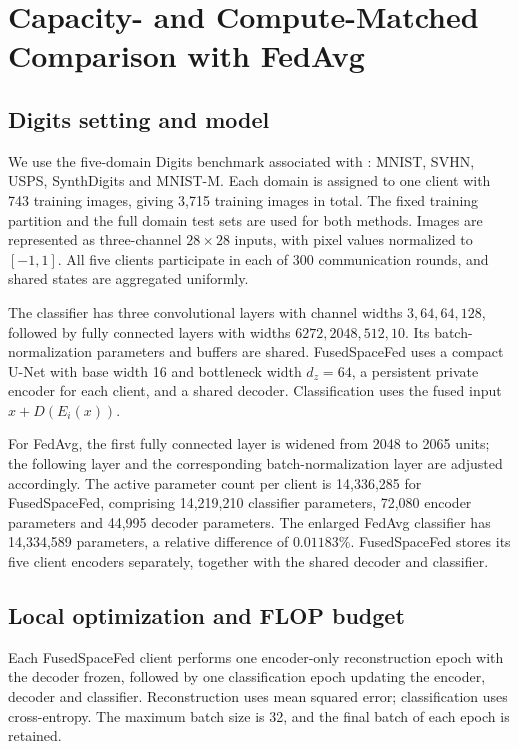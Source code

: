 \section{Capacity- and Compute-Matched Comparison with FedAvg}
\label{app:capacity_compute_comparison}

\subsection{Digits setting and model}

We use the five-domain Digits benchmark associated with
\citet{li2021fedbn}: MNIST, SVHN, USPS, SynthDigits and MNIST-M.
Each domain is assigned to one client with 743 training images, giving
3,715 training images in total. The fixed training partition and the full
domain test sets are used for both methods. Images are represented as
three-channel $28\times28$ inputs, with pixel values normalized to
$[-1,1]$. All five clients participate in each of 300 communication rounds,
and shared states are aggregated uniformly.

The classifier has three convolutional layers with channel widths
$3,64,64,128$, followed by fully connected layers with widths
$6272,2048,512,10$. Its batch-normalization parameters and buffers are shared.
FusedSpaceFed uses a compact U-Net with base width 16 and bottleneck
width $d_z=64$, a persistent private encoder for each client, and a shared
decoder. Classification uses the fused input $x+D(E_i(x))$.

For FedAvg, the first fully connected layer is widened from 2048 to 2065
units; the following layer and the corresponding batch-normalization
layer are adjusted accordingly. The active parameter count per client is
14,336,285 for FusedSpaceFed, comprising 14,219,210 classifier parameters,
72,080 encoder parameters and 44,995 decoder parameters.
The enlarged FedAvg classifier has 14,334,589 parameters, a relative
difference of $0.01183\%$. FusedSpaceFed stores its five client encoders
separately, together with the shared decoder and classifier.

\subsection{Local optimization and FLOP budget}

Each FusedSpaceFed client performs one encoder-only reconstruction epoch
with the decoder frozen, followed by one classification epoch updating
the encoder, decoder and classifier. Reconstruction uses mean squared
error; classification uses cross-entropy. The maximum batch size is 32,
and the final batch of each epoch is retained.

